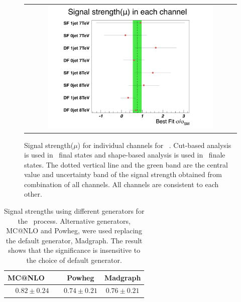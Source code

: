 %
\begin{figure}[htp] 
\centering 
\begin{tabular}{c} 
\includegraphics[width=0.8\textwidth]{figures/mu_allchannels.pdf}
\end{tabular} 
\caption{ Signal strength($\mu$) for individual channels for ~\GeV.
Cut-based analysis is used in \SF\ final states 
and shape-based analysis is used in \DF\ finale states. 
The dotted vertical line and the green band are 
the central value and uncertainty band of the signal strength 
obtained from combination of all channels. 
All channels are consistent to each other.
} 
\label{fig:mu_allchannels} 
\end{figure} 

%
\begin{table}[htp] 
\begin{center} 
\begin{tabular}{c|c|c} 
\hline 
MC@NLO   &  Powheg & Madgraph \\
\hline \hline 
$0.82 \pm 0.24$ & $0.74 \pm 0.21$ & $0.76 \pm 0.21$ \\
\hline 
\end{tabular} 
\caption{ Signal strengths 
using different generators for the \qqww\ process. Alternative generators,
MC@NLO and Powheg, were used replacing the default generator, Madgraph.
The result shows that the significance is insensitive to the choice
of default generator.} 
\label{tab:mu_diffgenerator} 
\end{center} 
\end{table} 



